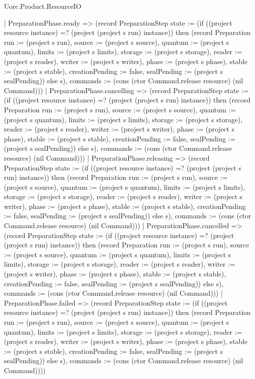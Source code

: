 \begin{lexlean}{Uorc.Product.ResourceIO}
\begin{semanticmodule}
{    | PreparationPhase.ready => (record PreparationStep {state := (if ((project resource instance) =? (project (project s run) instance)) then (record Preparation {run := (project s run), source := (project s source), quantum := (project s quantum), limits := (project s limits), storage := (project s storage), reader := (project s reader), writer := (project s writer), phase := (project s phase), stable := (project s stable), creationPending := false, sealPending := (project s sealPending)}) else s), commands := (cons (ctor Command.release resource) (nil Command))})
    | PreparationPhase.cancelling => (record PreparationStep {state := (if ((project resource instance) =? (project (project s run) instance)) then (record Preparation {run := (project s run), source := (project s source), quantum := (project s quantum), limits := (project s limits), storage := (project s storage), reader := (project s reader), writer := (project s writer), phase := (project s phase), stable := (project s stable), creationPending := false, sealPending := (project s sealPending)}) else s), commands := (cons (ctor Command.release resource) (nil Command))})
    | PreparationPhase.releasing => (record PreparationStep {state := (if ((project resource instance) =? (project (project s run) instance)) then (record Preparation {run := (project s run), source := (project s source), quantum := (project s quantum), limits := (project s limits), storage := (project s storage), reader := (project s reader), writer := (project s writer), phase := (project s phase), stable := (project s stable), creationPending := false, sealPending := (project s sealPending)}) else s), commands := (cons (ctor Command.release resource) (nil Command))})
    | PreparationPhase.cancelled => (record PreparationStep {state := (if ((project resource instance) =? (project (project s run) instance)) then (record Preparation {run := (project s run), source := (project s source), quantum := (project s quantum), limits := (project s limits), storage := (project s storage), reader := (project s reader), writer := (project s writer), phase := (project s phase), stable := (project s stable), creationPending := false, sealPending := (project s sealPending)}) else s), commands := (cons (ctor Command.release resource) (nil Command))})
    | PreparationPhase.failed => (record PreparationStep {state := (if ((project resource instance) =? (project (project s run) instance)) then (record Preparation {run := (project s run), source := (project s source), quantum := (project s quantum), limits := (project s limits), storage := (project s storage), reader := (project s reader), writer := (project s writer), phase := (project s phase), stable := (project s stable), creationPending := false, sealPending := (project s sealPending)}) else s), commands := (cons (ctor Command.release resource) (nil Command))}))
}


\end{semanticmodule}
\end{lexlean}

